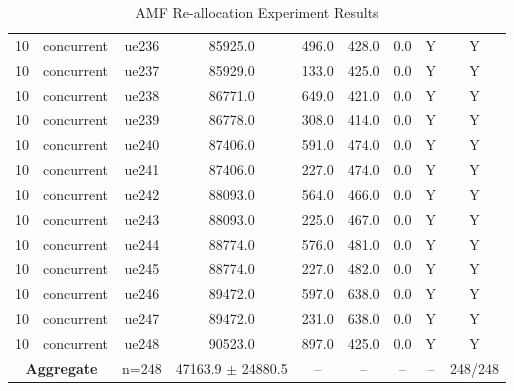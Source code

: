 \begin{table}[ht]
\begin{tabular}{|c|c|c|c|c|c|c|c|c|}
10 & concurrent & ue236 & 85925.0 & 496.0 & 428.0 & 0.0 & Y & Y \\
10 & concurrent & ue237 & 85929.0 & 133.0 & 425.0 & 0.0 & Y & Y \\
10 & concurrent & ue238 & 86771.0 & 649.0 & 421.0 & 0.0 & Y & Y \\
10 & concurrent & ue239 & 86778.0 & 308.0 & 414.0 & 0.0 & Y & Y \\
10 & concurrent & ue240 & 87406.0 & 591.0 & 474.0 & 0.0 & Y & Y \\
10 & concurrent & ue241 & 87406.0 & 227.0 & 474.0 & 0.0 & Y & Y \\
10 & concurrent & ue242 & 88093.0 & 564.0 & 466.0 & 0.0 & Y & Y \\
10 & concurrent & ue243 & 88093.0 & 225.0 & 467.0 & 0.0 & Y & Y \\
10 & concurrent & ue244 & 88774.0 & 576.0 & 481.0 & 0.0 & Y & Y \\
10 & concurrent & ue245 & 88774.0 & 227.0 & 482.0 & 0.0 & Y & Y \\
10 & concurrent & ue246 & 89472.0 & 597.0 & 638.0 & 0.0 & Y & Y \\
10 & concurrent & ue247 & 89472.0 & 231.0 & 638.0 & 0.0 & Y & Y \\
10 & concurrent & ue248 & 90523.0 & 897.0 & 425.0 & 0.0 & Y & Y \\
\multicolumn{2}{|c|}{\textbf{Aggregate}} & n=248 & 47163.9 $\pm$ 24880.5 & -- & -- & -- & -- & 248/248 \\
\hline
\end{tabular}
\caption{AMF Re-allocation Experiment Results}
\label{tab:amf_realloc}
\end{table}
